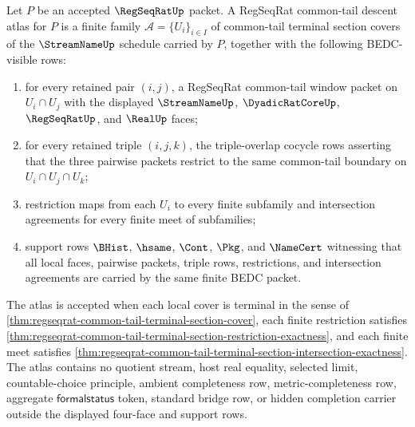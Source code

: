 \begin{definition}
\label{def:regseqrat-common-tail-descent-atlas}
Let $P$ be an accepted $\RegSeqRatUp$ packet. A RegSeqRat common-tail descent atlas for $P$ is a finite family $\mathcal A=\{U_i\}_{i \in I}$ of common-tail terminal section covers of the $\StreamNameUp$ schedule carried by $P$, together with the following BEDC-visible rows:
\begin{enumerate}
\item for every retained pair $(i,j)$, a RegSeqRat common-tail window packet on $U_i \cap U_j$ with the displayed $\StreamNameUp$, $\DyadicRatCoreUp$, $\RegSeqRatUp$, and $\RealUp$ faces;
\item for every retained triple $(i,j,k)$, the triple-overlap cocycle rows asserting that the three pairwise packets restrict to the same common-tail boundary on $U_i \cap U_j \cap U_k$;
\item restriction maps from each $U_i$ to every finite subfamily and intersection agreements for every finite meet of subfamilies;
\item support rows $\BHist$, $\hsame$, $\Cont$, $\Pkg$, and $\NameCert$ witnessing that all local faces, pairwise packets, triple rows, restrictions, and intersection agreements are carried by the same finite BEDC packet.
\end{enumerate}
The atlas is accepted when each local cover is terminal in the sense of \autoref{thm:regseqrat-common-tail-terminal-section-cover}, each finite restriction satisfies \autoref{thm:regseqrat-common-tail-terminal-section-restriction-exactness}, and each finite meet satisfies \autoref{thm:regseqrat-common-tail-terminal-section-intersection-exactness}. The atlas contains no quotient stream, host real equality, selected limit, countable-choice principle, ambient completeness row, metric-completeness row, aggregate $\mathsf{formalstatus}$ token, standard bridge row, or hidden completion carrier outside the displayed four-face and support rows.
\end{definition}


